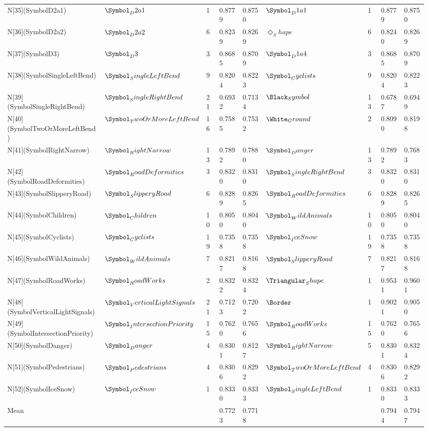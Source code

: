 \begin{tabular}{lllllllll}
N[35](SymbolD2a1) & $\Symbol_D2a1$ & 1 & 0.8779 & 0.8750 & $\Symbol_D1a1$ & 1 & 0.8779 & 0.8750 \\
N[36](SymbolD2a2) & $\Symbol_D2a2$ & 6 & 0.8239 & 0.8269 & $\Diamond_Shape$ & 6 & 0.8240 & 0.8269 \\
N[37](SymbolD3) & $\Symbol_D3$ & 3 & 0.8685 & 0.8709 & $\Symbol_D1a4$ & 3 & 0.8685 & 0.8709 \\
N[38](SymbolSingleLeftBend) & $\Symbol_SingleLeftBend$ & 9 & 0.8204 & 0.8223 & $\Symbol_Cyclists$ & 9 & 0.8204 & 0.8223 \\
N[39](SymbolSingleRightBend) & $\Symbol_SingleRightBend$ & 21 & 0.6932 & 0.7134 & $\Black_Symbol$ & 13 & 0.6787 & 0.6949 \\
N[40](SymbolTwoOrMoreLeftBend) & $\Symbol_TwoOrMoreLeftBend$ & 16 & 0.7585 & 0.7532 & $\White_Ground$ & 2 & 0.8090 & 0.8198 \\
N[41](SymbolRightNarrow) & $\Symbol_RightNarrow$ & 13 & 0.7892 & 0.7880 & $\Symbol_Danger$ & 13 & 0.7892 & 0.7683 \\
N[42](SymbolRoadDeformities) & $\Symbol_RoadDeformities$ & 3 & 0.8320 & 0.8310 & $\Symbol_SingleRightBend$ & 3 & 0.8320 & 0.8310 \\
N[43](SymbolSlipperyRoad) & $\Symbol_SlipperyRoad$ & 6 & 0.8289 & 0.8265 & $\Symbol_RoadDeformities$ & 6 & 0.8289 & 0.8265 \\
N[44](SymbolChildren) & $\Symbol_Children$ & 10 & 0.8050 & 0.8040 & $\Symbol_WildAnimals$ & 10 & 0.8050 & 0.8040 \\
N[45](SymbolCyclists) & $\Symbol_Cyclists$ & 19 & 0.7358 & 0.7358 & $\Symbol_IceSnow$ & 19 & 0.7358 & 0.7358 \\
N[46](SymbolWildAnimals) & $\Symbol_WildAnimals$ & 7 & 0.8217 & 0.8168 & $\Symbol_SlipperyRoad$ & 7 & 0.8217 & 0.8168 \\
N[47](SymbolRoadWorks) & $\Symbol_RoadWorks$ & 2 & 0.8322 & 0.8324 & $\Triangular_Shape$ & 1 & 0.9531 & 0.9601 \\
N[48](SymbolVerticalLightSignals) & $\Symbol_VerticalLightSignals$ & 21 & 0.7123 & 0.7202 & $\Border$ & 1 & 0.9021 & 0.9050 \\
N[49](SymbolIntersectionPriority) & $\Symbol_IntersectionPriority$ & 15 & 0.7620 & 0.7656 & $\Symbol_RoadWorks$ & 15 & 0.7620 & 0.7656 \\
N[50](SymbolDanger) & $\Symbol_Danger$ & 4 & 0.8301 & 0.8127 & $\Symbol_RightNarrow$ & 5 & 0.8301 & 0.8324 \\
N[51](SymbolPedestrians) & $\Symbol_Pedestrians$ & 4 & 0.8306 & 0.8292 & $\Symbol_TwoOrMoreLeftBend$ & 4 & 0.8306 & 0.8292 \\
N[52](SymbolIceSnow) & $\Symbol_IceSnow$ & 1 & 0.8330 & 0.8333 & $\Symbol_SingleLeftBend$ & 1 & 0.8330 & 0.8333 \\
Mean &  &  & 0.7723 & 0.7718 &  &  & 0.7944 & 0.7947 \\
\bottomrule
\end{tabular}
